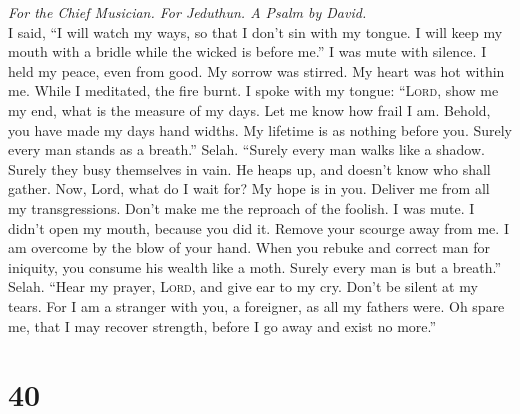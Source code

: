 \emph{For the Chief Musician. For Jeduthun. A Psalm by David.}\\
 I said, ``I will watch my ways, so that I don't sin with
my tongue. I will keep my mouth with a bridle while the wicked is before
me.''  I was mute with silence. I held my peace, even from
good. My sorrow was stirred.  My heart was hot within me.
While I meditated, the fire burnt. I spoke with my tongue:
 ``\textsc{Lord}, show me my end, what is the measure of
my days. Let me know how frail I am.  Behold, you have
made my days hand widths. My lifetime is as nothing before you. Surely
every man stands as a breath.'' Selah.  ``Surely every man
walks like a shadow. Surely they busy themselves in vain. He heaps up,
and doesn't know who shall gather.  Now, Lord, what do I
wait for? My hope is in you.  Deliver me from all my
transgressions. Don't make me the reproach of the foolish.
 I was mute. I didn't open my mouth, because you did it.
 Remove your scourge away from me. I am overcome by the
blow of your hand.  When you rebuke and correct man for
iniquity, you consume his wealth like a moth. Surely every man is but a
breath.'' Selah.  ``Hear my prayer, \textsc{Lord}, and
give ear to my cry. Don't be silent at my tears. For I am a stranger
with you, a foreigner, as all my fathers were.  Oh spare
me, that I may recover strength, before I go away and exist no more.''

\hypertarget{section-39}{%
\section{40}\label{section-39}}

